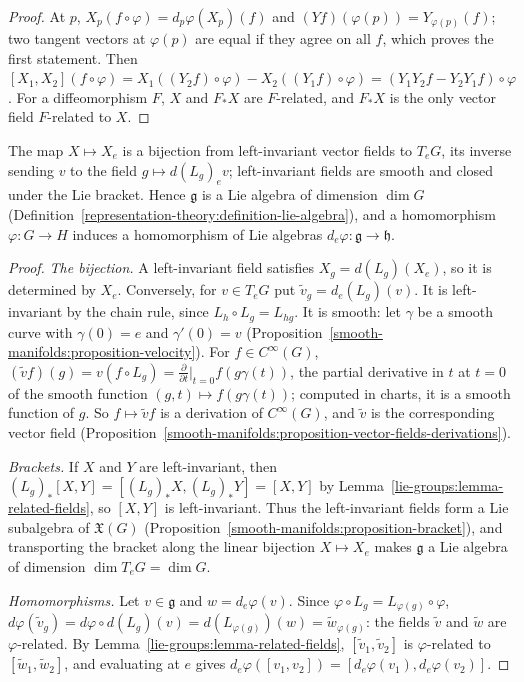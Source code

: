 \begin{proof}
At $p$, $X_p(f \circ \varphi) = d_p\varphi(X_p)(f)$ and $(Yf)(\varphi(p)) = Y_{\varphi(p)}(f)$; two tangent vectors at $\varphi(p)$ are equal if they agree on all
$f$, which proves the first statement. Then
$[X_1, X_2](f \circ \varphi) = X_1((Y_2f) \circ \varphi) - X_2((Y_1f) \circ \varphi) = (Y_1Y_2f - Y_2Y_1f) \circ \varphi$. For a diffeomorphism $F$, $X$ and
$F_*X$ are $F$-related, and $F_*X$ is the only vector field $F$-related to $X$.
\end{proof}

\begin{proposition}\label{lie-groups:proposition-left-invariant}
The map $X \mapsto X_e$ is a bijection from left-invariant vector fields to $T_eG$, its inverse sending $v$ to the field $g \mapsto d(L_g)_ev$; left-invariant fields are smooth and closed under the Lie
bracket. Hence $\mathfrak{g}$ is a Lie algebra of dimension $\dim G$ (Definition~\ref{representation-theory:definition-lie-algebra}), and a homomorphism $\varphi \colon G \to H$ induces a homomorphism of Lie
algebras $d_e\varphi \colon \mathfrak{g} \to \mathfrak{h}$.
\end{proposition}

\begin{proof}
\emph{The bijection.} A left-invariant field satisfies $X_g = d(L_g)(X_e)$, so it is determined by $X_e$. Conversely, for $v \in T_eG$ put
$\widetilde{v}_g = d_e(L_g)(v)$. It is left-invariant by the chain rule, since $L_h \circ L_g = L_{hg}$. It is smooth: let $\gamma$ be a smooth curve with
$\gamma(0) = e$ and $\gamma'(0) = v$ (Proposition~\ref{smooth-manifolds:proposition-velocity}). For $f \in C^\infty(G)$,
$(\widetilde{v}f)(g) = v(f \circ L_g) = \frac{\partial}{\partial t}\big|_{t=0}f(g\gamma(t))$, the partial derivative in $t$ at $t = 0$ of the smooth function
$(g, t) \mapsto f(g\gamma(t))$; computed in charts, it is a smooth function of $g$. So $f \mapsto \widetilde{v}f$ is a derivation of $C^\infty(G)$, and
$\widetilde{v}$ is the corresponding vector field (Proposition~\ref{smooth-manifolds:proposition-vector-fields-derivations}).

\emph{Brackets.} If $X$ and $Y$ are left-invariant, then $(L_g)_*[X, Y] = [(L_g)_*X, (L_g)_*Y] = [X, Y]$ by Lemma~\ref{lie-groups:lemma-related-fields}, so
$[X, Y]$ is left-invariant. Thus the left-invariant fields form a Lie subalgebra of $\mathfrak{X}(G)$ (Proposition~\ref{smooth-manifolds:proposition-bracket}),
and transporting the bracket along the linear bijection $X \mapsto X_e$ makes $\mathfrak{g}$ a Lie algebra of dimension $\dim T_eG = \dim G$.

\emph{Homomorphisms.} Let $v \in \mathfrak{g}$ and $w = d_e\varphi(v)$. Since $\varphi \circ L_g = L_{\varphi(g)} \circ \varphi$,
$d\varphi(\widetilde{v}_g) = d\varphi \circ d(L_g)(v) = d(L_{\varphi(g)})(w) = \widetilde{w}_{\varphi(g)}$: the fields $\widetilde{v}$ and $\widetilde{w}$ are
$\varphi$-related. By Lemma~\ref{lie-groups:lemma-related-fields}, $[\widetilde{v}_1, \widetilde{v}_2]$ is $\varphi$-related to
$[\widetilde{w}_1, \widetilde{w}_2]$, and evaluating at $e$ gives $d_e\varphi([v_1, v_2]) = [d_e\varphi(v_1), d_e\varphi(v_2)]$.
\end{proof}

